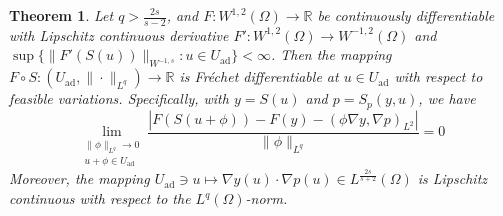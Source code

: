 \documentclass[11pt]{article}
\newcommand{\R}{\mathbb{R}}
\newcommand{\feas}{U_{\textrm{ad}}}
\newtheorem{theorem}{Theorem}[section]
\theoremstyle{definition}
\theoremstyle{remark}
\begin{document}
\begin{theorem}\label{thm:old_regularity_of_first_derivative}
Let $q > \frac{2s}{s - 2}$, and $F: W^{1,2}(\Omega)\to \R$ be continuously differentiable with  Lipschitz
continuous derivative $F' : W^{1,2}(\Omega) \to W^{-1,2}(\Omega)$ and $\sup\{ \|F'(S(u))\|_{W^{-1,s}} : u \in \feas\} < \infty$.
Then the mapping $F \circ S : (\feas, \|\cdot\|_{L^q}) \to \R$ is 
Fr\'echet differentiable at $u \in \feas$ with respect to feasible variations. Specifically, with $y = S(u)$ and $p = S_p(y, u)$, we have
%
\[ \underset{\substack{\|\phi\|_{L^q} \to 0\\ u+\phi\in\feas}}\lim
\frac{|F(S(u + \phi)) - F(y) - (\phi \nabla y, \nabla p)_{L^2}|}{\|\phi\|_{L^q}} = 0
\]
%
Moreover, the mapping
$
\feas \ni u
\mapsto
\nabla y(u)\cdot \nabla p(u)
\in L^{\frac{2s}{s+2}}(\Omega)
$
is Lipschitz continuous with respect to the $L^q(\Omega)$-norm.
\end{theorem}
\end{document}
